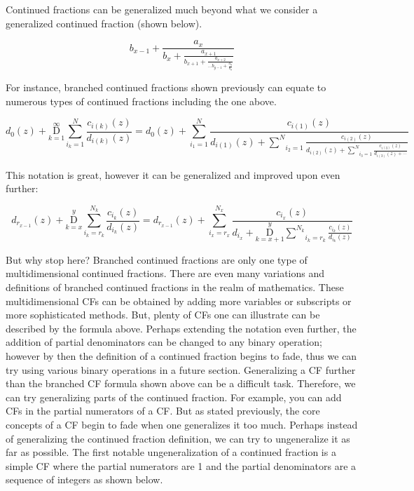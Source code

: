\documentclass{article}
\begin{document}
Continued fractions can be generalized much beyond what we consider a generalized continued fraction (shown below).

$$b_{x-1} + \frac{a_x}{b_x + \frac{a_{x+1}}{b_{x+1} + \frac{a_{x+2}}{... b_{y-1} + \frac{a_y}{b_y}}}}$$

For instance, branched continued fractions shown previously can equate to numerous types of continued fractions including the one above.

$$ d_0(z) + \underset{k=1}{\overset{\infty}{ \mathrm D}} \underset{i_k=1}{\overset{N}{ \sum}} \frac{c_{i(k)} (z)}{d_{i(k)} (z)} = d_0(z)  +\underset{i_1=1}{\overset{N}{ \sum}} \frac{c_{i(1)} (z)}{d_{i(1)} (z) + \underset{i_2=1}{\overset{N}{ \sum}} \frac{c_{i(2)} (z)}{d_{i(2)} (z) + \underset{i_3=1}{\overset{N}{ \sum}} \frac{c_{i(3)} (z)}{d_{i(3)} (z) + \cdots}}} $$

This notation is great, however it can be generalized and improved upon even further:

$$d_{r_{x-1}}(z) + \underset{k=x}{\overset{y}{ \mathrm D}} \underset{i_k=r_k}{\overset{N_k}{ \sum}} \frac{c_{i_k} (z)}{d_{i_k} (z)} = d_{r_{x-1}}(z)+ \underset{i_x=r_x}{\overset{N_x}{ \sum}} \frac{c_{i_x}(z)}{d_{i_x}+ \underset{k=x+1}{\overset{y}{ \mathrm D}} \underset{i_k=r_k}{\overset{N_k}{ \sum}} \frac{c_{i_k} (z)}{d_{i_k} (z)}}$$

But why stop here? Branched continued fractions are only one type of multidimensional continued fractions. There are even many variations and definitions of branched continued fractions in the realm of mathematics. These multidimensional CFs can be obtained by adding more variables or subscripts or more sophisticated methods. But, plenty of CFs one can illustrate can be described by the formula above. Perhaps extending the notation even further, the addition of partial denominators can be changed to any binary operation; however by then the definition of a continued fraction begins to fade, thus we can try using various binary operations in a future section. Generalizing a CF further than the branched CF formula shown above can be a difficult task. Therefore, we can try generalizing parts of the continued fraction. For example, you can add CFs in the partial numerators of a CF. But as stated previously, the core concepts of a CF begin to fade when one generalizes it too much. Perhaps instead of generalizing the continued fraction definition, we can try to ungeneralize it as far as possible. The first notable ungeneralization of a continued fraction is a simple CF where the partial numerators are 1 and the partial denominators are a sequence of integers as shown below.
\end{document}

